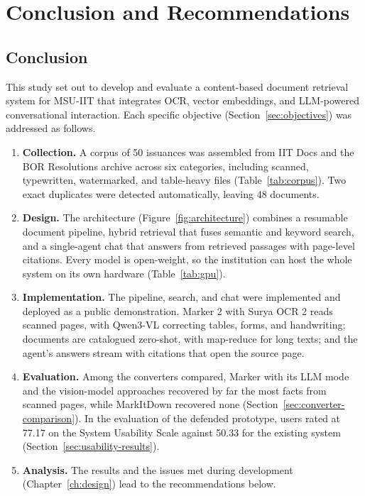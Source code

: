 \chapter{Conclusion and Recommendations}\label{ch:conclusion}

\section{Conclusion}

This study set out to develop and evaluate a content-based document retrieval system for MSU-IIT that integrates OCR, vector embeddings, and LLM-powered conversational interaction. Each specific objective (Section~\ref{sec:objectives}) was addressed as follows.

\begin{enumerate}
  \item \textbf{Collection.} A corpus of 50 issuances was assembled from IIT Docs and the BOR Resolutions archive across six categories, including scanned, typewritten, watermarked, and table-heavy files (Table~\ref{tab:corpus}). Two exact duplicates were detected automatically, leaving 48 documents.
  \item \textbf{Design.} The architecture (Figure~\ref{fig:architecture}) combines a resumable document pipeline, hybrid retrieval that fuses semantic and keyword search, and a single-agent chat that answers from retrieved passages with page-level citations. Every model is open-weight, so the institution can host the whole system on its own hardware (Table~\ref{tab:gpu}).
  \item \textbf{Implementation.} The pipeline, search, and chat were implemented and deployed as a public demonstration. Marker 2 with Surya OCR 2 reads scanned pages, with Qwen3-VL correcting tables, forms, and handwriting; documents are catalogued zero-shot, with map-reduce for long texts; and the agent's answers stream with citations that open the source page.
  \item \textbf{Evaluation.} Among the converters compared, Marker with its LLM mode and the vision-model approaches recovered by far the most facts from scanned pages, while MarkItDown recovered none (Section~\ref{sec:converter-comparison}). In the evaluation of the defended prototype, users rated \cs{} at 77.17 on the System Usability Scale against 50.33 for the existing system (Section~\ref{sec:usability-results}). 
  \item \textbf{Analysis.} The results and the issues met during development (Chapter~\ref{ch:design}) lead to the recommendations below.
\end{enumerate}

